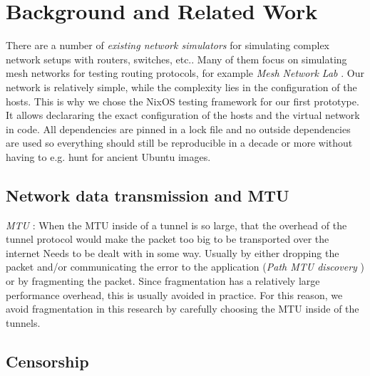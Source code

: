 
\chapter{Background and Related Work}
\label{chap:background}


There are a number of \textit{existing network simulators} \cite{network-simulators-list} for simulating complex network setups with routers, switches, etc..
Many of them focus on simulating mesh networks for testing routing protocols, for example \textit{Mesh Network Lab} \cite{meshnet-lab}.
Our network is relatively simple, while the complexity lies in the configuration of the hosts.
This is why we chose the NixOS testing framework for our first prototype.
It allows declararing the exact configuration of the hosts and the virtual network in code.
All dependencies are pinned in a lock file and no outside dependencies are used so everything should still be reproducible in a decade or more without having to e.g. hunt for ancient Ubuntu images.

\section{Network data transmission and MTU}
\textit{MTU} \cite{wiki:Maximum_transmission_unit}:
When the MTU inside of a tunnel is so large, that the overhead of the tunnel protocol would make the packet too big to be transported over the internet
Needs to be dealt with in some way. Usually by either dropping the packet and/or communicating the error to the application (\textit{Path MTU discovery} \cite{wiki:Path_MTU_Discovery}) or by fragmenting the packet. Since fragmentation has a relatively large performance overhead, this is usually avoided in practice. For this reason, we avoid fragmentation in this research by carefully choosing the MTU inside of the tunnels.

\section{Censorship}
